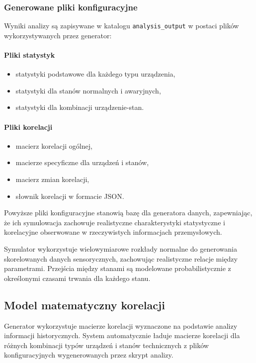 \subsubsection{Generowane pliki konfiguracyjne}

Wyniki analizy są zapisywane w katalogu \texttt{analysis\_output} w postaci plików wykorzystywanych przez generator:

\paragraph{Pliki statystyk}
\begin{itemize}
    \item statystyki podstawowe dla każdego typu urządzenia,
    \item statystyki dla stanów normalnych i awaryjnych,
    \item statystyki dla kombinacji urządzenie-stan.
\end{itemize}

\paragraph{Pliki korelacji}
\begin{itemize}
    \item macierz korelacji ogólnej,
    \item macierze specyficzne dla urządzeń i stanów,
    \item macierz zmian korelacji,
    \item słownik korelacji w formacie JSON.
\end{itemize}

Powyższe pliki konfiguracyjne stanowią bazę dla generatora danych, zapewniając, że ich symulowacja zachowuje realistyczne charakterystyki statystyczne i korelacyjne obserwowane w rzeczywistych informacjach przemysłowych.

Symulator wykorzystuje wielowymiarowe rozkłady normalne do generowania skorelowanych danych sensorycznych, zachowując realistyczne relacje między parametrami. Przejścia między stanami są modelowane probabilistycznie z określonymi czasami trwania dla każdego stanu.


\subsection{Model matematyczny korelacji}
\label{subsec:model_korelacji}

Generator wykorzystuje macierze korelacji wyznaczone na podstawie analizy informacji historycznych. System automatycznie ładuje macierze korelacji dla różnych kombinacji typów urządzeń i stanów technicznych z plików konfiguracyjnych wygenerowanych przez skrypt analizy.

